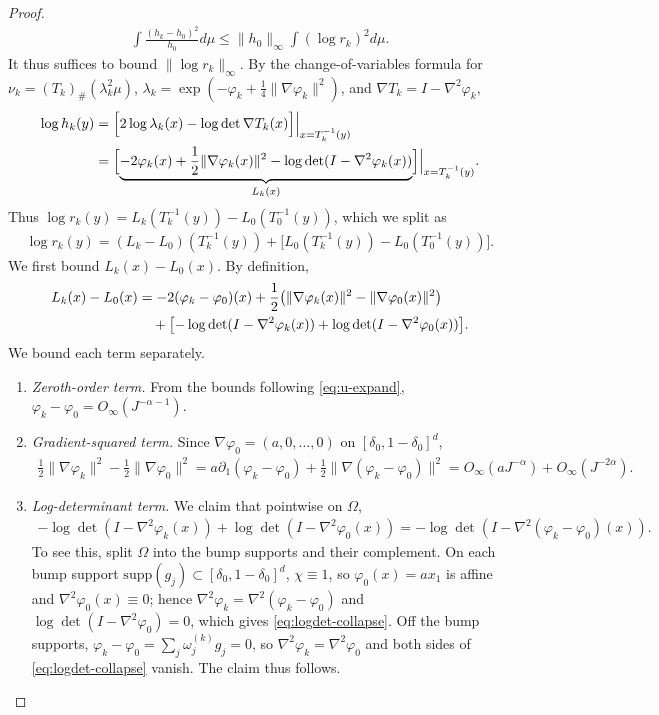 \documentclass[11pt,reqno]{amsart}
\theoremstyle{definition}
\begin{document}
\begin{proof}
\begin{align}
    \label{eq:I-reduction}
    \int \frac{(h_k-h_0)^2}{h_0} d\mu  \le  \|h_0\|_\infty \int(\log r_k)^2 d\mu.
\end{align}
It thus suffices to bound $\|\log r_k\|_\infty$. By the change-of-variables formula for $\nu_k=(T_k)_\#(\lambda_k^2\mu)$, $\lambda_k=\exp(-\varphi_k+\frac1{4}\|\nabla \varphi_k\|^2)$, and $\nabla T_k=I-\nabla^2\varphi_k$,
\begin{align}
    \log h_k(y)
    & =  \Bigl[ 2\log\lambda_k(x)-\log\det \nabla T_k(x) \Bigr]\Big\vert_{x=T_k^{-1}(y)} \\
    & =  \Bigl[ \underbrace{-2\varphi_k(x)+\frac1{2}\|\nabla \varphi_k(x)\|^2-\log\det(I-\nabla^2\varphi_k(x))}_{L_k(x)} \Bigr]\Big\vert_{x=T_k^{-1}(y)}.
\end{align}
Thus $\log r_k(y)=L_k(T_k^{-1}(y))-L_0(T_0^{-1}(y))$, which we split as
\begin{align}
    \label{eq:logr-split}
    \log r_k(y)  =  (L_k-L_0)(T_k^{-1}(y)) + \bigl[L_0(T_k^{-1}(y))-L_0(T_0^{-1}(y))\bigr].
\end{align}
We first bound $L_k(x) - L_0(x)$. By definition,
\begin{align}
    L_k(x)-L_0(x)
    &= -2(\varphi_k-\varphi_0)(x) + \frac1{2}\bigl(\|\nabla \varphi_k(x)\|^2-\|\nabla \varphi_0(x)\|^2\bigr) \notag\\
    &\quad + \bigl[-\log\det(I-\nabla^2 \varphi_k(x))+\log\det(I-\nabla^2 \varphi_0(x))\bigr].
\end{align}
We bound each term separately.
\begin{enumerate}
\item[(i)] \emph{Zeroth-order term.} From the bounds following \eqref{eq:u-expand}, $\varphi_k-\varphi_0=O_\infty(J^{-\alpha-1})$.

\item[(ii)] \emph{Gradient-squared term.} Since $\nabla \varphi_0=(a,0,\dots,0)$ on $[\delta_0,1-\delta_0]^d$,
\begin{align}
    \frac1{2}\|\nabla \varphi_k\|^2-\frac1{2}\|\nabla \varphi_0\|^2
    = a \partial_1(\varphi_k-\varphi_0)+\frac1{2}\|\nabla(\varphi_k-\varphi_0)\|^2
    = O_\infty(a J^{-\alpha}) + O_\infty(J^{-2\alpha}).
\end{align}

\item[(iii)] \emph{Log-determinant term.} We claim that pointwise on $\Omega$,
\begin{align}
    \label{eq:logdet-collapse}
    -\log\det(I-\nabla^2 \varphi_k(x)) + \log\det(I-\nabla^2 \varphi_0(x))  =  -\log\det(I-\nabla^2(\varphi_k-\varphi_0)(x)).
\end{align}
To see this, split $\Omega$ into the bump supports and their complement. On each bump support $\mathrm{supp}(g_j)\subset[\delta_0,1-\delta_0]^d$, $\chi\equiv 1$, so $\varphi_0(x)=ax_1$ is affine and $\nabla^2 \varphi_0(x)\equiv 0$; hence $\nabla^2 \varphi_k=\nabla^2(\varphi_k-\varphi_0)$ and $\log\det(I-\nabla^2 \varphi_0)=0$, which gives \eqref{eq:logdet-collapse}. Off the bump supports, $\varphi_k-\varphi_0=\sum_j\omega_j^{(k)}g_j=0$, so $\nabla^2 \varphi_k=\nabla^2 \varphi_0$ and both sides of \eqref{eq:logdet-collapse} vanish. The claim thus follows.


\end{enumerate}
\end{proof}
\end{document}
